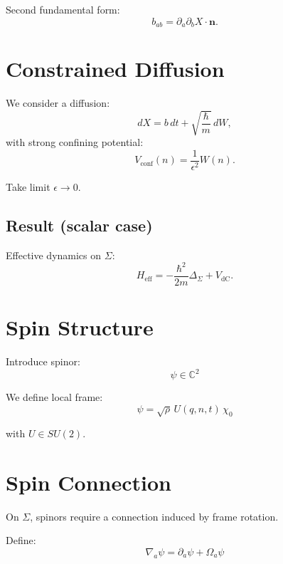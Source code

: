 \documentclass[11pt]{article}
\begin{document}
Second fundamental form:
\begin{equation}
b_{ab} = \partial_a \partial_b X \cdot \mathbf{n}.
\end{equation}

\section{Constrained Diffusion}

We consider a diffusion:
\begin{equation}
dX = b\,dt + \sqrt{\frac{\hbar}{m}}\, dW,
\end{equation}
with strong confining potential:
\begin{equation}
V_{\text{conf}}(n) = \frac{1}{\epsilon^2} W(n).
\end{equation}

Take limit $\epsilon \to 0$.

\subsection{Result (scalar case)}

Effective dynamics on $\Sigma$:
\begin{equation}
H_{\text{eff}} = -\frac{\hbar^2}{2m}\Delta_\Sigma + V_{\text{dC}}.
\end{equation}

\section{Spin Structure}

Introduce spinor:
\begin{equation}
\psi \in \mathbb{C}^2
\end{equation}

We define local frame:
\begin{equation}
\psi = \sqrt{\rho}\, U(q,n,t)\,\chi_0
\end{equation}

with $U \in SU(2)$.

\section{Spin Connection}

On $\Sigma$, spinors require a connection induced by frame rotation.

Define:
\begin{equation}
\nabla_a \psi = \partial_a \psi + \Omega_a \psi
\end{equation}
\end{document}
